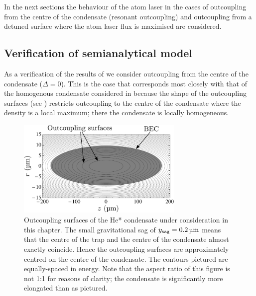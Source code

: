In the next sections the behaviour of the atom laser in the cases of outcoupling from the centre of the condensate (resonant outcoupling) and outcoupling from a detuned surface where the atom laser flux is maximised are considered.

\subsection{Verification of semianalytical model}

As a verification of the results of  we consider outcoupling from the centre of the condensate ($\Delta = 0$). This is the case that corresponds most closely with that of the homogenous condensate considered in  because the shape of the outcoupling surfaces (see ) restricts outcoupling to the centre of the condensate where the density is a local maximum; there the condensate is locally homogeneous.

\begin{figure}
    \centering
    \includegraphics[width=8cm]{OutcouplingSurfaces}
    \caption{Outcoupling surfaces of the He* condensate under consideration in this chapter. The small gravitational sag of $y_\text{sag} = \unit[0.2]{\micro m}$ means that the centre of the trap and the centre of the condensate almost exactly coincide. Hence the outcoupling surfaces are approximately centred on the centre of the condensate. The contours pictured are equally-spaced in energy. Note that the aspect ratio of this figure is not 1:1 for reasons of clarity; the condensate is significantly more elongated than as pictured. \label{Peaks:OutcouplingSurfaces}}
\end{figure}

